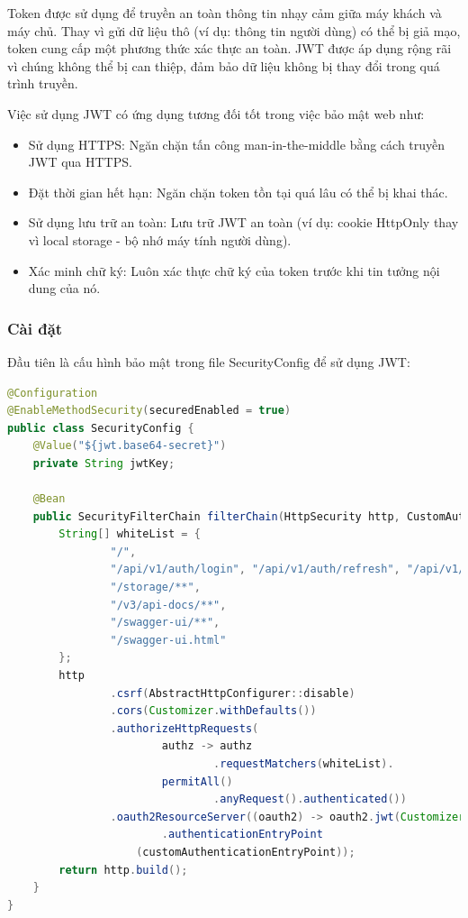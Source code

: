 \documentclass[../BTL.tex]{subfiles}
\begin{document}
Token được sử dụng để truyền an toàn thông tin nhạy cảm giữa máy khách và máy chủ. Thay vì gửi dữ liệu thô (ví dụ: thông tin người dùng) có thể bị giả mạo, token cung cấp một phương thức xác thực an toàn. JWT được áp dụng rộng rãi vì chúng không thể bị can thiệp, đảm bảo dữ liệu không bị thay đổi trong quá trình truyền.

Việc sử dụng JWT có ứng dụng tương đối tốt trong việc bảo mật web như:
\begin{itemize}
    \item Sử dụng HTTPS: Ngăn chặn tấn công man-in-the-middle bằng cách truyền JWT qua HTTPS.
    \item Đặt thời gian hết hạn: Ngăn chặn token tồn tại quá lâu có thể bị khai thác.
    \item Sử dụng lưu trữ an toàn: Lưu trữ JWT an toàn (ví dụ: cookie HttpOnly thay vì local storage - bộ nhớ máy tính người dùng).
    \item Xác minh chữ ký: Luôn xác thực chữ ký của token trước khi tin tưởng nội dung của nó.
\end{itemize}
\subsubsection{ Cài đặt}
Đầu tiên là cấu hình bảo mật trong file SecurityConfig để sử dụng JWT:
\begin{lstlisting}[language=Java]
@Configuration
@EnableMethodSecurity(securedEnabled = true)
public class SecurityConfig {
    @Value("${jwt.base64-secret}")
    private String jwtKey;
    
    @Bean
    public SecurityFilterChain filterChain(HttpSecurity http, CustomAuthenticationEntryPoint customAuthenticationEntryPoint) throws Exception {
        String[] whiteList = {
                "/",
                "/api/v1/auth/login", "/api/v1/auth/refresh", "/api/v1/auth/register",
                "/storage/**",
                "/v3/api-docs/**",
                "/swagger-ui/**",
                "/swagger-ui.html"
        };
        http
                .csrf(AbstractHttpConfigurer::disable)
                .cors(Customizer.withDefaults())
                .authorizeHttpRequests(
                        authz -> authz
                                .requestMatchers(whiteList).
                        permitAll()
                                .anyRequest().authenticated())
                .oauth2ResourceServer((oauth2) -> oauth2.jwt(Customizer.withDefaults())
                        .authenticationEntryPoint
                    (customAuthenticationEntryPoint));
        return http.build();
    }
}
\end{lstlisting}
\end{document}
